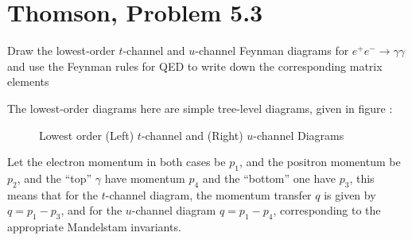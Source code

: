 \documentclass[12pt]{article}
\begin{document}
\section{Thomson, Problem 5.3}
\begin{problem}
  Draw the lowest-order $t$-channel and $u$-channel Feynman diagrams for $e^+e^-\to\gamma\gamma$ and use the Feynman rules for QED to write down the corresponding matrix elements
\end{problem}
The lowest-order diagrams here are simple tree-level diagrams, given in figure :
\begin{figure}[H]
  \centering
  \caption{Lowest order (Left) $t$-channel and (Right) $u$-channel Diagrams}\label{fig:diagrams}
\end{figure}
Let the electron momentum in both cases be $p_1$, and the positron momentum  be $p_2$, and the ``top'' $\gamma$ have momentum $p_4$ and the ``bottom'' one have $p_3$, this means that for the $t$-channel diagram, the momentum transfer $q$ is given by $q=p_1-p_3$, and for the $u$-channel diagram $q=p_1-p_4$, corresponding to the appropriate Mandelstam invariants.
\end{document}
